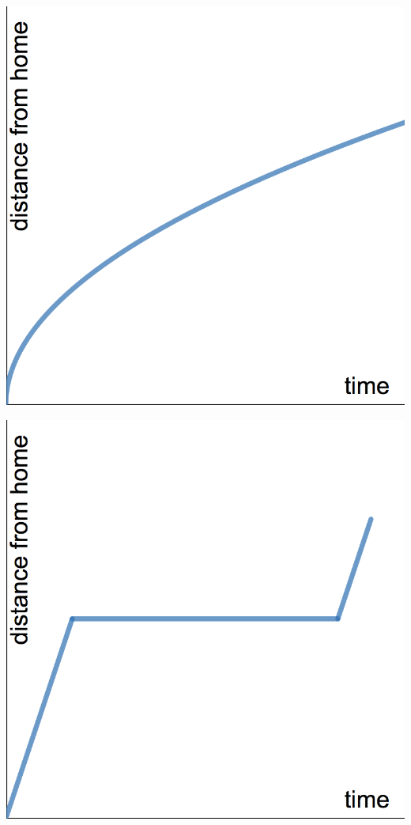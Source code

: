 \documentclass[11pt]{exam}
\theoremstyle{definition}
\begin{document}
\begin{questions}
	\begin{enumerate}[(I)]
	\begin{minipage}{.25\textwidth}
		\item \includegraphics[scale=0.1]{graph1.png}
	\end{minipage}
	\begin{minipage}{.25\textwidth}
		\item \includegraphics[scale=0.1]{graph2.png}

\end{minipage}
\end{enumerate}
\end{questions}
\end{document}

